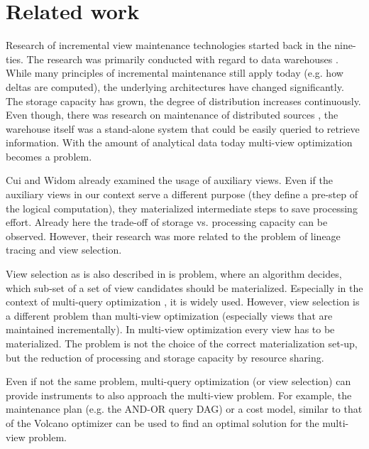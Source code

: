 \section{Related work}

Research of incremental view maintenance technologies started back in 
the nine-ties. The research was primarily conducted with regard to data 
warehouses \cite{warehouse1, warehouse2, warehouse3, warehouse4}. While 
many principles of incremental maintenance still apply today (e.g. how 
deltas are computed), the underlying architectures have changed 
significantly. The storage capacity has grown, the degree of 
distribution increases continuously. Even though, there was research on 
maintenance of distributed sources \cite{warehouse3}, the warehouse 
itself was a stand-alone system that could be easily queried to retrieve 
information. With the amount of analytical data today multi-view 
optimization becomes a problem. 

Cui and Widom \cite{warehouse1, warehouse2} already examined the usage 
of auxiliary views. Even if the auxiliary views in our context serve a 
different purpose (they define a pre-step of the logical computation), 
they materialized intermediate steps to save processing effort. Already 
here the trade-off of storage vs. processing capacity can be observed. 
However, their research \cite{warehouse1, warehouse2} was more related 
to the problem of lineage tracing and view selection. 

View selection as is also described in \cite{view_selection1, 
view_selection2} is problem, where an algorithm decides, which sub-set 
of a set of view candidates should be materialized. Especially in the 
context of multi-query optimization \cite{multi_query1, multi_query2, 
multi_query3, multi_query4, multi_query5}, it is widely used. However, 
view selection is a different problem than multi-view optimization 
(especially views that are maintained incrementally). In multi-view 
optimization every view has to be materialized. The problem is not the 
choice of the correct materialization set-up, but the reduction of 
processing and storage capacity by resource sharing. 

Even if not the same problem, multi-query optimization (or view 
selection) can provide instruments to also approach the multi-view 
problem. For example, the maintenance plan (e.g. the AND-OR query DAG) 
or a cost model, similar to that of the Volcano optimizer 
\cite{multi_query4, multi_query5} can be used to find an optimal 
solution for the multi-view problem. 

